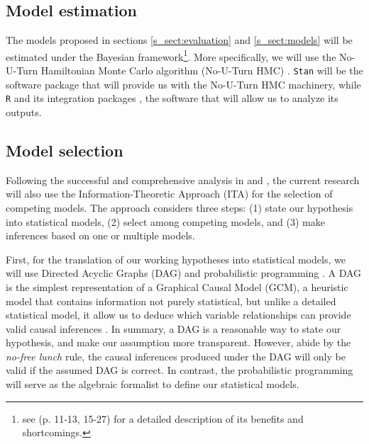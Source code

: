 \subsection{Model estimation} \label{s_sect:estimation}
%
The models proposed in sections \ref{s_sect:evaluation} and \ref{s_sect:models} will be estimated under the Bayesian framework\footnote{see \citet{Rivera_2021} (p. 11-13, 15-27) for a detailed description of its benefits and shortcomings.}. More specifically, we will use the No-U-Turn Hamiltonian Monte Carlo algorithm (No-U-Turn HMC) \citep{Betancourt_et_al_2013, Duane_et_al_1987, Hoffman_et_al_2014, Neal_2012}. \texttt{Stan} \citep{Stan_2020} will be the software package that will provide us with the No-U-Turn HMC machinery, while \texttt{R} \citep{R_2015} and its integration packages \citep{RStan_2020}, the software that will allow us to analyze its outputs.
%
%
\subsection{Model selection} \label{s_sect:model_sel}
%
Following the successful and comprehensive analysis in \citet{vanDaal_2020} and \citet{Lesterhuis_2018}, the current research will also use the Information-Theoretic Approach (ITA) \citep{Anderson_2008, Chamberlain_1965} for the selection of competing models. The approach considers three steps: (1) state our hypothesis into statistical models, (2) select among competing models, and (3) make inferences based on one or multiple models.

First, for the translation of our working hypotheses into statistical models, we will use Directed Acyclic Graphs (DAG) and probabilistic programming \citep{Jaynes_2003}. A DAG is the simplest representation of a Graphical Causal Model (GCM), a heuristic model that contains information not purely statistical, but unlike a detailed statistical model, it allow us to deduce which variable relationships can provide valid causal inferences \citep{Hernan_et_al_2020, McElreath_2020}. In summary, a DAG is a reasonable way to state our hypothesis, and make our assumption more transparent. However, abide by the \textit{no-free lunch} rule, the causal inferences produced under the DAG will only be valid if the assumed DAG is correct. In contrast, the probabilistic programming will serve as the algebraic formalist to define our statistical models.

